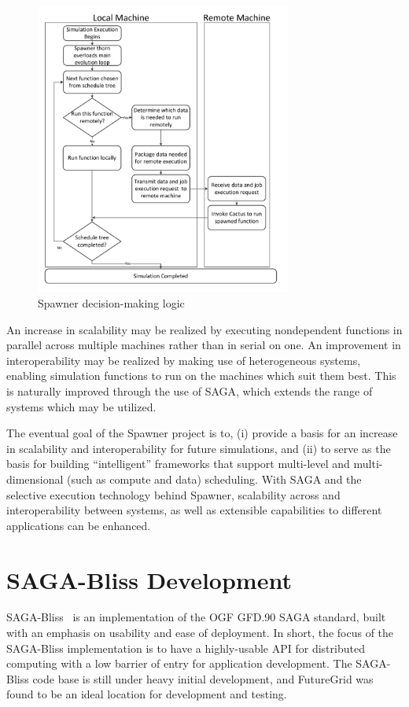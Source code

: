 \documentclass[]{paper}
\begin{document}
\begin{figure}[t]
	\centering
		\includegraphics[width=0.75\textwidth]{figures/spawner-logic.pdf}
\caption{Spawner decision-making logic}
\label{fig:spawner}
\end{figure}		

An increase in scalability may be realized by executing nondependent functions in parallel across multiple machines rather than in serial on one.  An improvement in interoperability may be realized by making use of heterogeneous systems, enabling simulation functions to run on the machines which suit them best.  This is naturally improved through the use of SAGA, which extends the range of systems which may be utilized.

The eventual goal of the Spawner project is to, (i) provide a basis for an increase in scalability and interoperability for future simulations, and (ii) to serve as the basis for building ``intelligent'' frameworks that support multi-level and multi-dimensional (such as compute and data) scheduling.  With SAGA and the selective execution technology behind Spawner, scalability across and interoperability between systems, as well as extensible capabilities to different applications can be enhanced.

\section{SAGA-Bliss Development} SAGA-Bliss~\cite{saga-bliss} is an implementation of the OGF GFD.90 SAGA standard, built with an emphasis on usability and ease of deployment.  %
In short, the focus of the SAGA-Bliss implementation is to have a highly-usable API for distributed computing with a low barrier of entry for application development. The SAGA-Bliss code base is still under heavy initial development, and FutureGrid was found to be an ideal location for development and testing.
\end{document}
